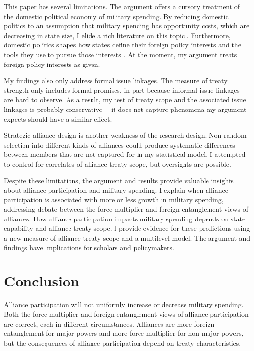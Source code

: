 \documentclass[12pt]{article}
\begin{document}
This paper has several limitations.
The argument offers a cursory treatment of the domestic political economy of military spending. 
By reducing domestic politics to an assumption that military spending has opportunity costs, which are decreasing in state size, I elide a rich literature on this topic \citep{WhittenWilliams2011, AlptekinLevine2012}. 
Furthermore, domestic politics shapes how states define their foreign policy interests and the tools they use to pursue those interests \citep{Fordham1998, Fordham2011, Narizny2007}.
At the moment, my argument treats foreign policy interests as given.  


My findings also only address formal issue linkages. 
The measure of treaty strength only includes formal promises, in part because informal issue linkages are hard to observe. 
As a result, my test of treaty scope and the associated issue linkages is probably conservative--- it does not capture phenomena my argument expects should have a similar effect. 


Strategic alliance design is another weakness of the research design. 
Non-random selection into different kinds of alliances could produce systematic differences between members that are not captured for in my statistical model. 
I attempted to control for correlates of alliance treaty scope, but oversights are possible. 


Despite these limitations, the argument and results provide valuable insights about alliance participation and military spending. 
I explain when alliance participation is associated with more or less growth in military spending, addressing debate between the force multiplier and foreign entanglement views of alliances. 
How alliance participation impacts military spending depends on state capability and alliance treaty scope. 
I provide evidence for these predictions using a new measure of alliance treaty scope and a multilevel model. 
The argument and findings have implications for scholars and policymakers. 


\section{Conclusion}

Alliance participation will not uniformly increase or decrease military spending. 
Both the force multiplier and foreign entanglement views of alliance participation are correct, each in different circumstances.
Alliances are more foreign entanglement for major powers and more force multiplier for non-major powers, but the consequences of alliance participation depend on treaty characteristics.  
\end{document}
